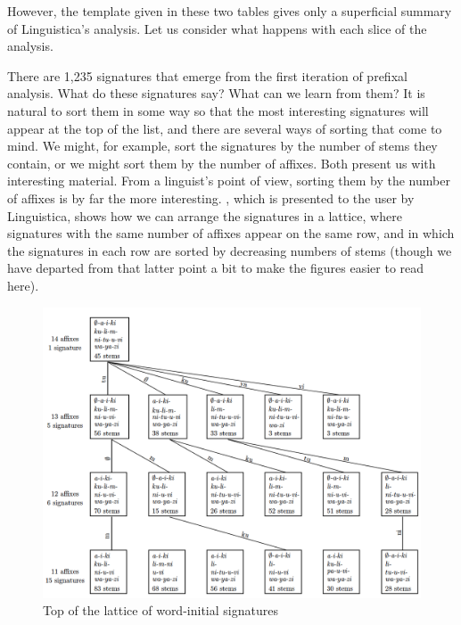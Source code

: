 \documentclass[output=paper,colorlinks,citecolor=brown]{langscibook}
\begin{document}
 
However, the template given in these two tables gives only a superficial summary of Linguistica's analysis. Let us consider what happens with each slice of the analysis.

 
There are 1,235 signatures that emerge from the first iteration of prefixal analysis. What do these signatures say? What can we learn from them? It is natural to sort them in some way so that the most interesting signatures will appear at the top of the list, and there are several ways of sorting that come to mind. We might, for example, sort the signatures by the number of stems they contain, or we might sort them by the number of affixes. Both present us with interesting material. From a linguist's point of view, sorting them by the number of affixes is by far the more interesting. , which is presented to the user by Linguistica, shows how we can arrange the signatures in a lattice, where signatures with the same number of affixes appear on the same row, and in which the signatures in each row are sorted by decreasing numbers of stems (though we have departed from that latter point a bit to make the figures easier to read here).\largerpage
 
\begin{figure}
\includegraphics[width=\textwidth]{figures/top_of_lattice.png}
\caption{Top of the lattice of word-initial signatures}
\label{lattice}
\end{figure}

\end{document}
